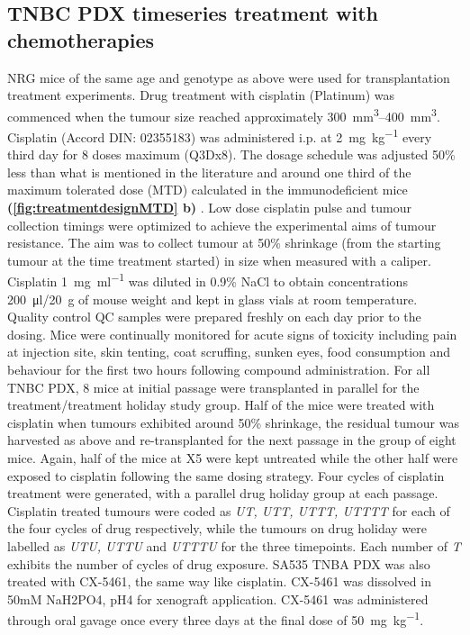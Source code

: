 \subsection{TNBC PDX timeseries treatment with chemotherapies}
\label{ssec:rx}
NRG mice of the same age and genotype as above were used for transplantation treatment experiments. Drug treatment with cisplatin (Platinum) was commenced when the tumour size reached approximately \SIrange{300}{400}{\mm\cubed}. Cisplatin (Accord DIN: 02355183)  was administered i.p. at \SI{2}{\mg\per\kg} every third day for 8 doses maximum (Q3Dx8). The dosage schedule was adjusted 50\% less than what is mentioned in the literature \cite{li2013enhanced,wang2013klotho} and around one third of the maximum tolerated dose (MTD) calculated in the immunodeficient mice  \textbf{(\autoref{fig:treatmentdesignMTD} b)} . Low dose cisplatin pulse and tumour collection timings were optimized to achieve the experimental aims of tumour resistance. The aim was to collect tumour at 50\% shrinkage (from the starting tumour at the time treatment started) in size when measured with a caliper. Cisplatin \SI{1}{\mg\per\ml} was diluted in 0.9\% NaCl to obtain concentrations \SI{200}{\ul}/\SI{20}{\g} of mouse weight and kept in glass vials at room temperature. Quality control \ac{QC} samples were prepared freshly on each day prior to the dosing. Mice were continually monitored for acute signs of toxicity including pain at injection site, skin tenting, coat scruffing, sunken eyes, food consumption and behaviour for the first two hours following compound administration. For all TNBC PDX, 8 mice at initial passage were transplanted in parallel for the treatment/treatment holiday study group. Half of the mice were treated with cisplatin when tumours exhibited around 50\% shrinkage, the residual tumour was harvested as above and re-transplanted for the next passage in the group of eight mice. Again, half of the mice at X5 were kept untreated while the other half were exposed to cisplatin following the same dosing strategy. Four cycles of cisplatin treatment were generated, with a parallel drug holiday group at each passage. Cisplatin treated tumours were coded as \textit{UT, UTT, UTTT, UTTTT} for each of the four cycles of drug respectively, while the tumours on drug holiday were labelled as \textit{UTU, UTTU} and \textit{UTTTU} for the three timepoints. Each number of \textit{T} exhibits the number of cycles of drug exposure. SA535 TNBA PDX was also treated with CX-5461, the same way like cisplatin. CX-5461 was dissolved in 50mM NaH2PO4, pH4 for xenograft application. CX-5461 was administered through oral gavage once every three days at the final dose of \SI{50}{\mg\per\kg}.

